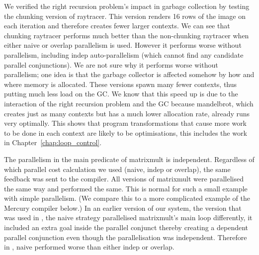 We verified the right recursion problem's impact in garbage collection by
testing the chunking version of raytracer.
This version renders 16 rows of the image on each iteration and therefore
creates fewer larger contexts.
We can see that chunking raytracer performs much better than the
non-chunking raytracer when either naive or overlap parallelism is used.
However it performs worse without parallelism, including indep
auto-parallelism (which cannot find any candidate parallel conjunctions).
We are not sure why it performs worse without parallelism;
one idea is that the garbage collector is affected somehow by how and where
memory is allocated.
These versions spawn many fewer contexts, thus putting much less load
on the GC.
We know that this speed up is due to the interaction of the right recursion
problem and the GC because mandelbrot,
which creates just as many contexts but has a much lower allocation rate,
already runs very optimally.
This shows that
program transformations that cause more work to be done in each context
are likely to be optimisations,
this includes the work in Chapter~\ref{chap:loop_control}.

The parallelism in the main predicate of matrixmult is independent.
Regardless of which parallel cost calculation we used (naive, indep or
overlap),
the same feedback was sent to the compiler.
All versions of matrixmult were parallelised the same way and performed the
same.
This is normal for such a small example with simple parallelism.
(We compare this to a more complicated example of the Mercury compiler
below.)
In an earlier version of our system,
the version that was used in \citet*{bone:2011:overlap},
the naive strategy parallelised matrixmult's main loop
differently,
it included an extra goal inside the parallel conjunct thereby creating
a dependent parallel conjunction even though the parallelisation was
independent.
Therefore in \citet*{bone:2011:overlap},
naive performed worse than either indep or overlap.


